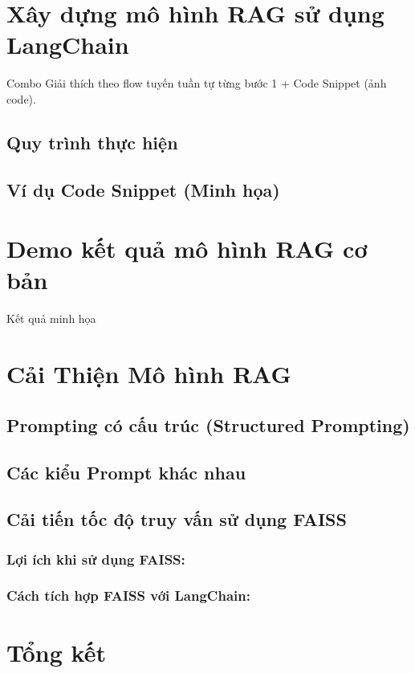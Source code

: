 \documentclass[11pt]{article}
\begin{document}
\section{Xây dựng mô hình RAG sử dụng LangChain}
Combo Giải thích theo flow tuyến tuần tự từng bước 1 + Code Snippet (ảnh code).
\subsection*{Quy trình thực hiện}
\subsection*{Ví dụ Code Snippet (Minh họa)}

\section{Demo kết quả mô hình RAG cơ bản}
Kết quả minh họa

\section{Cải Thiện Mô hình RAG}

\subsection{Prompting có cấu trúc (Structured Prompting)}

\subsection{Các kiểu Prompt khác nhau}
\subsection{Cải tiến tốc độ truy vấn sử dụng FAISS}

\subsubsection*{Lợi ích khi sử dụng FAISS:}

\subsubsection*{Cách tích hợp FAISS với LangChain:}

\section{Tổng kết}
\end{document}
